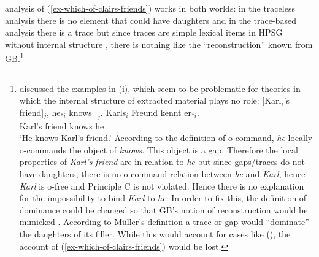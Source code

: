 \documentclass[output=paper
 	        ,biblatex
                ,babelshorthands
                ,newtxmath
                ,draftmode
                ,colorlinks, citecolor=brown
]{langscibook}
\begin{document}
 analysis of (\ref{ex-which-of-clairs-friends}) works in both worlds: in the
traceless analysis there is no element that could have daughters and in the trace-based analysis
there is a trace but since traces are simple lexical items in HPSG without internal structure \citep[164]{ps2}, there
is nothing like the ``reconstruction'' known from GB.\footnote{
\citet[Section~20.2]{Mueller99a} discussed the examples in (i), which seem to be problematic for
theories in which the internal structure of extracted material plays no role:
\eal
\ex {}[Karl$_i$'s friend]$_j$, he$_{*i}$ knows $\__j$.
\ex 
\gll Karls$_i$ Freund kennt er$_{*i}$.\\
     Karl's    friend knows he\\
\glt `He knows Karl's friend.'
\zl
According to the definition of o-command, \emph{he} locally o-commands the object of
\emph{knows}. This object is a gap. Therefore the local properties of \emph{Karl's
  friend} are in relation to \emph{he} but since gaps/traces do not have daughters, there is no o-command
relation between \emph{he} and \emph{Karl}, hence \emph{Karl} is o-free and Principle C is not
violated. Hence there is no explanation for the impossibility to bind \emph{Karl} to \emph{he}. In
order to fix this, the definition of dominance could be changed so that GB's notion of
reconstruction would be mimicked \citep[--410]{Mueller99a}. According to Müller's definition a trace or gap
would ``dominate'' the daughters of its filler. While this would account for cases like (),
the account of (\ref{ex-which-of-clairs-friends}) would be lost.


}
\end{document}
